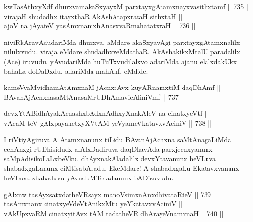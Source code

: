 
\begin{shl}
kwTasAthxyXdf dhurxvamakaSxyayxM parxtayxgAtamxnayxvasithxtamf \hfill || 735 ||  \\
virajaH shudadhx itayxthaR AkAshAtapxrataH sithxtaH || \\
ajoV na jAyateV yasAmxnamxhAnasxvaRmahatatxraH \hfill || 736 ||  
\end{shl}

\begin{artha} 
niviRkAravAdudariMda dhurxva, aMdare akaSxyavAgi parxtayxgAtamxnalilx 
nilulxvudu. viraja eMdare shudadhxveMdathaR. AkAshakikxMtalU 
paradalilx (Ace) iruvudu. yAvudariMda huTuTxvudilalxvo adariMda ajanu 
elalxdakUkx bahaLa doDaDxdu. adariMda mahAnf, eMdide.
\end{artha}


\begin{shl}
kameVvaMvidhamAtAmxnaM jAcnxtAvx kuyARnamxtiM daqDhAmf || \\
BAvanAjAcnxnasaMtAnasaMrUDhAmavicAliniVmf \hfill || 737 ||  
\end{shl}
				
\begin{shl}
devxYtABidhAyakAcnashxbAdxnAdhxyXnakAleV na cinatxyeVtf || \\
vAcaM teV gAlxpayanetxyXVtAM yeVyameVkatavxvAciniV \hfill || 738 ||  
\end{shl}

\begin{artha} 
I riVtiyAgiruva A Atamxnanunx tiLidu BAvanAjAcnxna saMtAnagaLiMda 
cenAnxgi rUDhisidudx alAlxDadiruva daqDhavAda parxjecnxyanunx 
saMpAdisikoLaLxbeVku. dhAyxnakAladalilx devxYtavanunx heVLuva 
shabadxgaLanunx ciMtisabAradu. EkeMdare! A shabadxgaLu Ekatavxvanunx 
heVLuva shabadxvu yAvuduMTo adanunx bADisuvudu.
\end{artha}


\begin{shl}
gAlxnw tasAyxsatxdatheVR\s sayx manoV\s simxnAnxdhivataRteV \hfill || 739 || \\
tasAmxnanx cinatxyeVdeVtAnikxMtu yeYkatavxvAciniV || \\
vAkUpxvaRM cinatxyitAvx tAM tadatheVR dhArayeVnamxnaH \hfill || 740 ||  
\end{shl}

